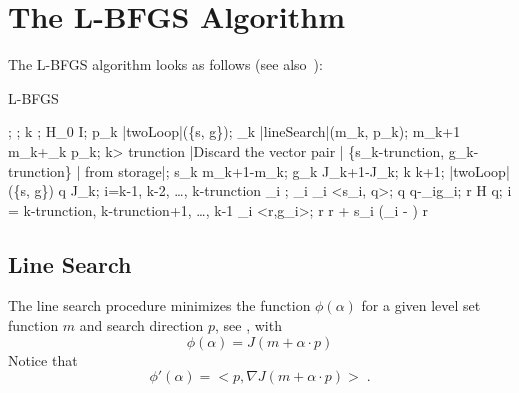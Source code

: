 
\section{The L-BFGS Algorithm}

The L-BFGS algorithm looks as follows (see also~\cite{Nocedal1980}):
\begin{algorithm}
    \mbox{L-BFGS}
    \begin{program}
        \BEGIN
        ;
        ;
        k ;
        H_0 \leftarrow I;
        \WHILE \NOT{} \DO
        p_k \leftarrow |twoLoop|(\{s, g\});
        \alpha_k \leftarrow |lineSearch|(m_k, p_k); 
        m_{k+1} \leftarrow m_k+\alpha_k p_k;
        \IF k> trunction
        \THEN
            |Discard the vector pair | \{s_{k-trunction}, g_{k-trunction}\} | from storage|;
        \FI
        s_k \leftarrow m_{k+1}-m_k;
        g_k \leftarrow \nabla J_{k+1}-\nabla J_k;
        k \leftarrow k+1;
        \OD
        \WHERE
        \FUNCT |twoLoop|(\{s, g\}) \BODY
            \EXP q \leftarrow \nabla J_k;
            \FOR i=k-1, k-2, \ldots, k-trunction \DO
            \rho_i \leftarrow {};
            \alpha_i \leftarrow \rho_i <s_i, q>;
            q \leftarrow q-\alpha_i\cdot  g_i;
            \OD
            r \leftarrow H q;
            \FOR i = k-trunction, k-trunction+1, \ldots, k-1 \DO
            \beta \leftarrow \rho_i \cdot <r,g_i>;
            r \leftarrow r + s_i \cdot (\alpha_i - \beta)
            \OD
            r \ENDEXP \ENDFUNCT
        \END
    \end{program}
\end{algorithm}

\subsection{Line Search}\label{sec:LineSearch}
The line search procedure minimizes the function $\phi(\alpha)$ for a given
level set function $m$ and search direction $p$, see \cite{Nocedal2006},
\cite{MoreThuente1992} with
\begin{equation}\label{EQU:MIN:22}
\phi(\alpha) = J(m+ \alpha \cdot  p)
\end{equation}
Notice that 
\begin{equation}\label{EQU:MIN:23}
\phi'(\alpha) = < p , \nabla J(m+\alpha \cdot p)> \; .
\end{equation}


